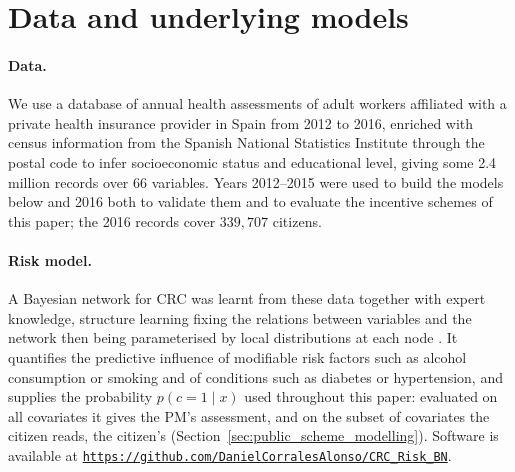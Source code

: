 \documentclass[12pt]{article}
\begin{document}
\section{Data and underlying models}\label{app:models}

\paragraph{Data.} We use a database of annual health assessments of adult workers affiliated with a private health insurance provider in Spain from 2012 to 2016, enriched with census information from the Spanish National Statistics Institute through the postal code to infer socioeconomic status and educational level, giving some 2.4 million records over 66 variables. Years 2012--2015 were used to build the models below and 2016 both to validate them and to evaluate the incentive schemes of this paper; the 2016 records cover $339{,}707$ citizens.

\paragraph{Risk model.} A Bayesian network for CRC was learnt from these data together with expert knowledge, structure learning fixing the relations between variables and the network then being parameterised by local distributions at each node \citep{corrales2024colorectal}. It quantifies the predictive influence of modifiable risk factors such as alcohol consumption or smoking and of conditions such as diabetes or hypertension, and supplies the probability $p(c = 1 \mid x)$ used throughout this paper: evaluated on all covariates it gives the PM's assessment, and on the subset of covariates the citizen reads, the citizen's (Section~\ref{sec:public_scheme_modelling}). Software is available at \texttt{\url{https://github.com/DanielCorralesAlonso/CRC_Risk_BN}}.

\end{document}
